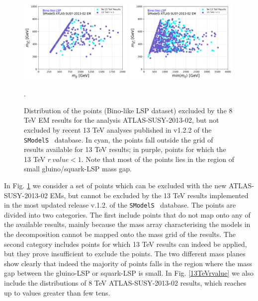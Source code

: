 \documentclass[a4paper,11pt]{article}
\newcommand{\SMO}{\texttt{SModelS\xspace}}
\begin{document}
%
\begin{figure}
	\begin{center}
		\subfigure
		{\includegraphics[width=0.49\textwidth]{PLOTS/13TeV/13TeV_Glu_Neu.pdf}}
		\subfigure
		{\includegraphics[width=0.49\textwidth]{PLOTS/13TeV/13TeV_Sq_Neu.pdf}}
	\end{center}
	\caption{Distribution of the points (Bino-like LSP dataset) excluded by the 8 TeV EM results for the analysis ATLAS-SUSY-2013-02, but not excluded by recent 13 TeV analyses published in v1.2.2 of the \SMO~ database. In cyan, the points fall outside the grid of results available for 13 TeV results; in purple, points for which the 13 TeV $r \ value <1$. Note that most of the points lies in the region of small gluino/squark-LSP mass gap.}. 
	\label{13TEV}
\end{figure}
%
%
In Fig. \ref{13TEV} we consider a set of points which can be excluded with the new ATLAS-SUSY-2013-02 EMs, but cannot be excluded by the 13 TeV results implemented in the most updated release v.1.2. of the \SMO~ database. The points are divided into two categories. The first include points that do not map onto any of the available results, mainly because the mass array characterising the models in the decomposition cannot be mapped onto the mass grid of the results. The second category includes points for which 13 TeV results can indeed be applied, but they prove insufficient to exclude the points. 
The two different mass planes show clearly that indeed the majority of points falls in the region where the mass gap between the gluino-LSP or squark-LSP is small. In Fig. \ref{13TeVrvalue} we also include the distributions of 8 TeV ATLAS-SUSY-2013-02 results, which reaches up to values greater than few tens.
%
\end{document}
